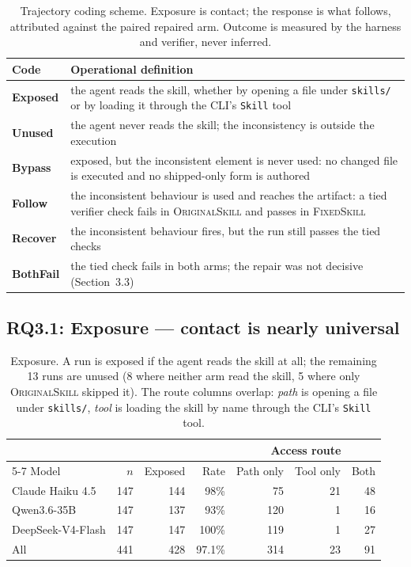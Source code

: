 \begin{table}[t]
\centering\small
\caption{Trajectory coding scheme. Exposure is contact; the response is what follows, attributed
against the paired repaired arm. Outcome is measured by the harness and verifier, never inferred.}
\label{tab:coding}
\begin{tabular}{@{}p{2.6cm}p{12.1cm}@{}}
\toprule
Code & Operational definition \\
\midrule
\textbf{Exposed} & the agent reads the skill, whether by opening a file under \texttt{skills/} or by
  loading it through the CLI's \texttt{Skill} tool \\
\textbf{Unused} & the agent never reads the skill; the inconsistency is outside the execution \\
\textbf{Bypass} & exposed, but the inconsistent element is never used: no changed file is executed and
  no shipped-only form is authored \\
\textbf{Follow} & the inconsistent behaviour is used and reaches the artifact: a tied verifier check
  fails in \textsc{OriginalSkill} and passes in \textsc{FixedSkill} \\
\textbf{Recover} & the inconsistent behaviour fires, but the run still passes the tied checks \\
\textbf{BothFail} & the tied check fails in both arms; the repair was not decisive (Section~3.3) \\
\bottomrule
\end{tabular}
\end{table}

\subsection{RQ3.1: Exposure --- contact is nearly universal}
\label{sec:rq3-exposure}

\begin{table}[t]
\centering\small
\caption{Exposure. A run is exposed if the agent reads the skill at all; the remaining 13 runs are
unused (8 where neither arm read the skill, 5 where only \textsc{OriginalSkill} skipped it). The route
columns overlap: \emph{path} is opening a file under \texttt{skills/}, \emph{tool} is loading the skill
by name through the CLI's \texttt{Skill} tool.}
\label{tab:exposure}
\begin{tabular}{@{}lrrrrrr@{}}
\toprule
 & & & & \multicolumn{3}{c}{Access route} \\
\cmidrule(l){5-7}
Model & $n$ & Exposed & Rate & Path only & Tool only & Both \\
\midrule
Claude Haiku 4.5  & 147 & 144 &  98\%  &  75 & 21 & 48 \\
Qwen3.6-35B       & 147 & 137 &  93\%  & 120 & 1  & 16 \\
DeepSeek-V4-Flash & 147 & 147 & 100\%  & 119 & 1  & 27 \\
\midrule
All               & 441 & 428 & 97.1\% & 314 & 23 & 91 \\
\bottomrule
\end{tabular}
\end{table}

